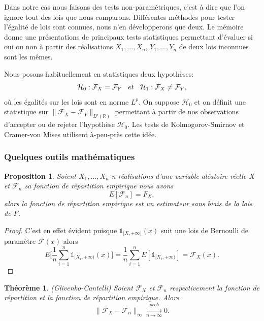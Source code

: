 \documentclass[a4paper,11pt]{article}
\newtheorem{theorem}{Théorème}[section]
\newtheorem{proposition}{Proposition}
\begin{document}
Dans notre cas nous faisons des tests non-paramétriques, c'est à dire que l'on ignore tout des lois que nous comparons.
Différentes méthodes pour tester l'égalité de lois sont connues, nous n'en développerons que deux. Le mémoire \cite{ethier2011propos} donne une présentations de principaux tests statistiques permettant d'évaluer si oui ou non à partir des réalisations $X_1,...,X_n$, $Y_1,...,Y_n$ de deux lois inconnues sont les mêmes. 

Nous posons habituellement en statistiques deux hypothèses:
\[ \mathcal{H}_0: \mathcal{F}_{X} = \mathcal{F}_{Y} \hspace{3mm} et \hspace{3mm} \mathcal{H}_1: \mathcal{F}_{X} \neq \mathcal{F}_{Y},\]
où les égalités sur les lois sont en norme $L^p$. On suppose $\mathcal{H}_0$ et on définit une statistique sur $\|\mathcal{F}_{X}-\mathcal{F}_{Y}\|_{L^p(\mathbb{R})}$ permettant à partir de nos observations d'accepter ou de rejeter l'hypothèse $\mathcal{H}_0$.
Les tests de Kolmogorov-Smirnov et Cramer-von Mises utilisent à-peu-près cette idée. 

\subsubsection{Quelques outils mathématiques}

\begin{proposition}
	\label{mean-rep-emp}
	Soient $X_1,...,X_n$ n réalisations d'une variable aléatoire réelle $X$ et $\mathcal{F}_{n}$ sa fonction de répartition empirique nous avons
	\[E[\mathcal{F}_n]=F_{X},\]
	alors la fonction de répartition empirique est un estimateur sans biais de la lois de $F$. 
\end{proposition}

\begin{proof}
	C'est en effet évident puisque $\mathds{1}_{[X, +\infty )}(x)$ suit une lois de Bernoulli de paramètre $\mathcal{F}(x)$ alors 
	\[E\Big[\frac{1}{n}\sum_{i=1}^{n}\mathds{1}_{[X_i, +\infty )}(x)\Big]= \frac{1}{n}\sum_{i=1}^{n}E[\mathds{1}_{[X_i, +\infty )}]=\mathcal{F}_{X}(x).\]
\end{proof}


\begin{theorem}(Glivenko-Cantelli)
	\label{th-glivenko}
Soient $\mathcal{F}_{X}$ et $\mathcal{F}_{n}$ respectivement la fonction de répartition et la fonction de répartition empirique. Alors 
\begin{equation}
	\|\mathcal{F}_{X}-\mathcal{F}_{n}\|_{\infty} \xrightarrow[n\to \infty]{prob} 0.
\end{equation}
\end{theorem}
\end{document}
